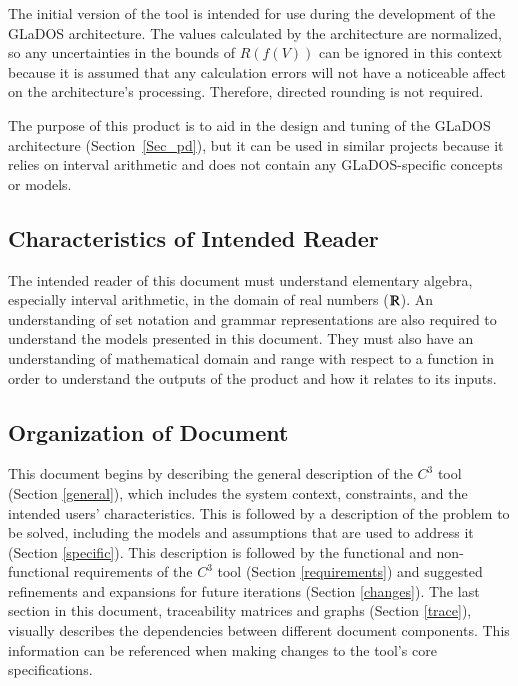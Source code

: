 \documentclass[12pt]{article}
\newcommand{\prognameAbbrv}{$C^{3}$}
\begin{document}
The initial version of the tool is intended for use during the development of 
the GLaDOS architecture. The values calculated by the architecture are 
normalized, so any uncertainties in the bounds of $R(f(V))$ can be ignored in 
this context because it is assumed that any calculation errors will not have a 
noticeable affect on the architecture's processing. Therefore, directed 
rounding is not required.

The purpose of this product is to aid in the design and tuning of the GLaDOS 
architecture (Section~\ref{Sec_pd}), but it can be used in similar projects 
because it relies on interval arithmetic and does not contain any 
GLaDOS-specific concepts or models.

\subsection{Characteristics of Intended Reader}
\label{intro_reader}
The intended reader of this document must understand elementary algebra, 
especially interval arithmetic, in the domain of real numbers 
($\varmathbb{R}$). An understanding of set notation and grammar representations 
are also required to understand the models presented in this document. They 
must also have an understanding of mathematical domain and range with respect 
to a function in order to understand the outputs of the product and how it 
relates to its inputs.

\subsection{Organization of Document}
This document begins by describing the general description of the 
\prognameAbbrv{} tool (Section \ref{general}), which includes the system 
context, constraints, and the intended users' characteristics. This is followed 
by a description of the problem to be solved, including the models and 
assumptions that are used to address it (Section \ref{specific}). This 
description is followed by the functional and non-functional requirements of 
the \prognameAbbrv{} tool (Section \ref{requirements}) and suggested 
refinements and expansions for future iterations (Section \ref{changes}). The 
last section in this document, traceability matrices and graphs (Section 
\ref{trace}), visually describes the dependencies between different document 
components. This information can be referenced when making changes to the 
tool's core specifications.

\newpage
\end{document}
